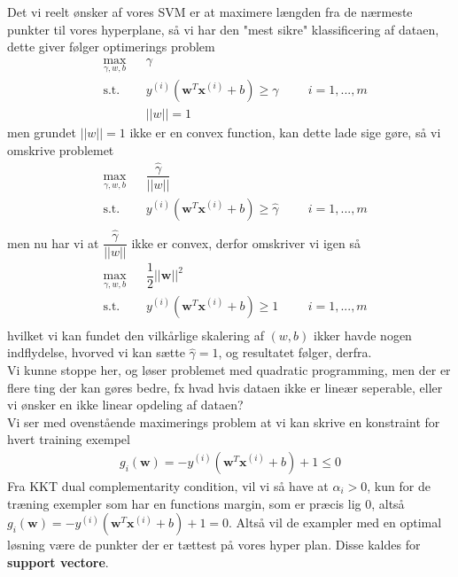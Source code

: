 \documentclass[paper=a4, fontsize=11pt]{scrartcl} %
\numberwithin{equation}{section} %
\numberwithin{figure}{section} %
\numberwithin{table}{section} %
\begin{document}
	Det vi reelt ønsker af vores SVM er at maximere længden fra de nærmeste punkter til vores hyperplane, så vi har den "mest sikre" klassificering af dataen, dette giver følger optimerings problem
	\begin{align}
	&\underset{\gamma,w,b}{\max}&&\gamma\\
	&\text{s.t.} &&y^{(i)}(\mathbf{w}^T\mathbf{x}^{(i)}+b)\geq\gamma \hspace{1cm}i=1,...,m \\
	& &&||w||=1
	\end{align}
	men grundet $||w||=1$ ikke er en convex function, kan dette lade sige gøre, så vi omskrive problemet
	\begin{align}
	&\underset{\gamma,w,b}{\max}&&\dfrac{\hat{\gamma}}{||w||}\\
	&\text{s.t.} && y^{(i)}(\mathbf{w}^T\mathbf{x}^{(i)}+b)\geq\hat{\gamma} \hspace{1cm}i=1,...,m \\
	\end{align}
	men nu har vi at $\dfrac{\hat{\gamma}}{||w||}$ ikke er convex, derfor omskriver vi igen så
	\begin{align}
	&\underset{\gamma,w,b}{\max}&&\dfrac{1}{2}||\mathbf{w}||^2 \\
	&\text{s.t.} && y^{(i)}(\mathbf{w}^T\mathbf{x}^{(i)}+b)\geq1\hspace{1cm}i=1,...,m \\
	\end{align}
	hvilket vi kan fundet den vilkårlige skalering af $(w,b)$ ikker havde nogen indflydelse, hvorved vi kan sætte $\hat{\gamma}=1$, og resultatet følger, derfra. \\
	
	Vi kunne stoppe her, og løser problemet med quadratic programming, men der er flere ting der kan gøres bedre, fx hvad hvis dataen ikke er lineær seperable, eller vi ønsker en ikke linear opdeling af dataen? \\
	
	Vi ser med ovenstående maximerings problem at vi kan skrive en konstraint for hvert training exempel
	\begin{align*}
	g_i(\mathbf{w})=-y^{(i)}(\mathbf{w}^T\mathbf{x}^{(i)}+b)+1\leq 0
	\end{align*}
	Fra KKT dual complementarity condition, vil vi så have at $\alpha_i >0$, kun for de træning exempler som har en functions margin, som er præcis lig $0$, altså $g_i(\mathbf{w})=-y^{(i)}(\mathbf{w}^T\mathbf{x}^{(i)}+b)+1=0$. Altså vil de exampler med en optimal løsning være de punkter der er tættest på vores hyper plan. Disse kaldes for \textbf{support vectore}. \\
	
\end{document}
